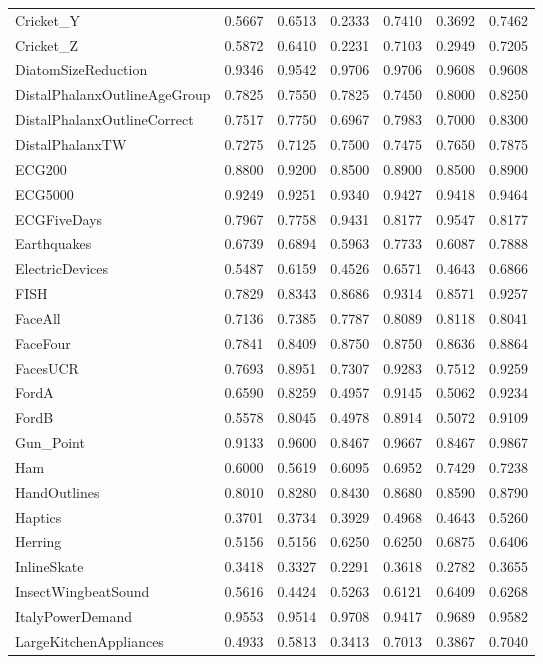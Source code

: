 \begin{longtable}[c]{p{5cm}<{\centering}*{6}{c}}
Cricket\_Y &0.5667 &0.6513 &0.2333 &0.7410 &0.3692 &0.7462 \\
Cricket\_Z &0.5872 &0.6410 &0.2231 &0.7103 &0.2949 &0.7205 \\
DiatomSizeReduction &0.9346 &0.9542 &0.9706 &0.9706 &0.9608 &0.9608 \\
DistalPhalanxOutlineAgeGroup &0.7825 &0.7550 &0.7825 &0.7450 &0.8000 &0.8250 \\
DistalPhalanxOutlineCorrect &0.7517 &0.7750 &0.6967 &0.7983 &0.7000 &0.8300 \\
DistalPhalanxTW &0.7275 &0.7125 &0.7500 &0.7475 &0.7650 &0.7875 \\
ECG200 &0.8800 &0.9200 &0.8500 &0.8900 &0.8500 &0.8900 \\
ECG5000 &0.9249 &0.9251 &0.9340 &0.9427 &0.9418 &0.9464 \\
ECGFiveDays &0.7967 &0.7758 &0.9431 &0.8177 &0.9547 &0.8177 \\
Earthquakes &0.6739 &0.6894 &0.5963 &0.7733 &0.6087 &0.7888 \\
ElectricDevices &0.5487 &0.6159 &0.4526 &0.6571 &0.4643 &0.6866 \\
FISH &0.7829 &0.8343 &0.8686 &0.9314 &0.8571 &0.9257 \\
FaceAll &0.7136 &0.7385 &0.7787 &0.8089 &0.8118 &0.8041 \\
FaceFour &0.7841 &0.8409 &0.8750 &0.8750 &0.8636 &0.8864 \\
FacesUCR &0.7693 &0.8951 &0.7307 &0.9283 &0.7512 &0.9259 \\
FordA &0.6590 &0.8259 &0.4957 &0.9145 &0.5062 &0.9234 \\
FordB &0.5578 &0.8045 &0.4978 &0.8914 &0.5072 &0.9109 \\
Gun\_Point &0.9133 &0.9600 &0.8467 &0.9667 &0.8467 &0.9867 \\
Ham &0.6000 &0.5619 &0.6095 &0.6952 &0.7429 &0.7238 \\
HandOutlines &0.8010 &0.8280 &0.8430 &0.8680 &0.8590 &0.8790 \\
Haptics &0.3701 &0.3734 &0.3929 &0.4968 &0.4643 &0.5260 \\
Herring &0.5156 &0.5156 &0.6250 &0.6250 &0.6875 &0.6406 \\
InlineSkate &0.3418 &0.3327 &0.2291 &0.3618 &0.2782 &0.3655 \\
InsectWingbeatSound &0.5616 &0.4424 &0.5263 &0.6121 &0.6409 &0.6268 \\
ItalyPowerDemand &0.9553 &0.9514 &0.9708 &0.9417 &0.9689 &0.9582 \\
LargeKitchenAppliances &0.4933 &0.5813 &0.3413 &0.7013 &0.3867 &0.7040 \\

\end{longtable}
